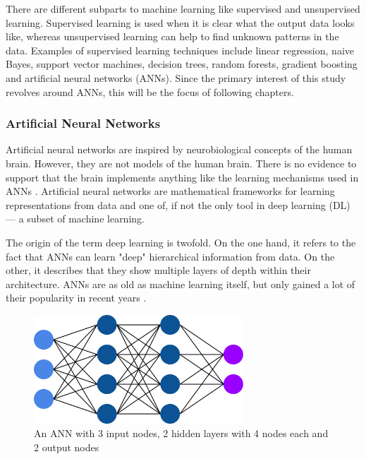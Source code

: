 There are different subparts to machine learning like supervised and unsupervised learning. Supervised learning is used when it is clear what the output data looks like, whereas unsupervised learning can help to find unknown patterns in the data. Examples of supervised learning techniques include linear regression, naive Bayes, support vector machines, decision trees, random forests, gradient boosting and artificial neural networks (ANNs). Since the primary interest of this study revolves around ANNs, this will be the focus of following chapters.

\subsubsection{Artificial Neural Networks}

Artificial neural networks are inspired by neurobiological concepts of the human brain. However, they are not models of the human brain. There is no evidence to support that the brain implements anything like the learning mechanisms used in ANNs \cite{Chollet2017}. Artificial neural networks are mathematical frameworks for learning representations from data and one of, if not the only tool in deep learning (DL) --- a subset of machine learning.

The origin of the term deep learning is twofold. On the one hand, it refers to the fact that ANNs can learn "deep" hierarchical information from data. On the other, it describes that they show multiple layers of depth within their architecture. ANNs are as old as machine learning itself, but only gained a lot of their popularity in recent years \cite{Chollet2017}.

\begin{figure}[H]
\centering
\par
\includegraphics[width=0.7\textwidth]{imgs/ann.png}
\caption{An ANN with 3 input nodes, 2 hidden layers with 4 nodes each and 2 output nodes}
\par
\end{figure}


